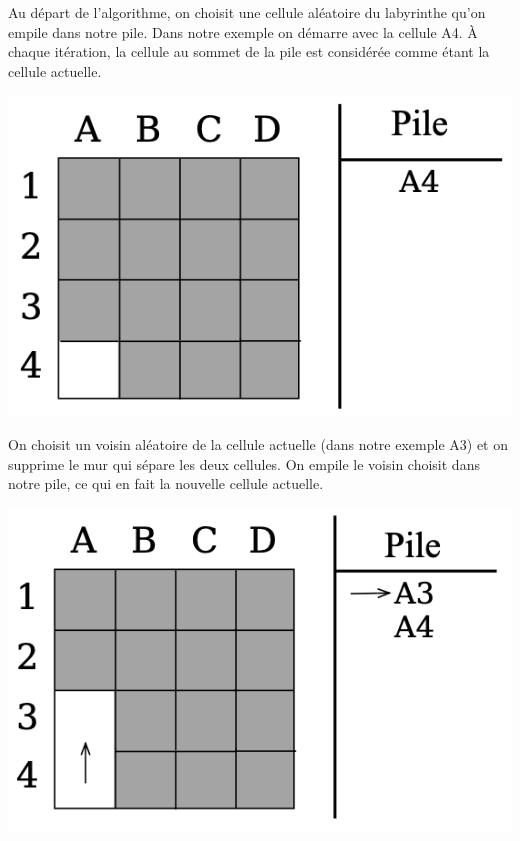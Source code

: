 \begin{minipage}{0.6\textwidth}
Au départ de l'algorithme, on choisit une cellule aléatoire du labyrinthe qu'on empile dans notre pile. Dans notre exemple on démarre avec la cellule A4. À chaque itération, la cellule au sommet de la pile est considérée comme étant la cellule actuelle.
\end{minipage}
\begin{minipage}{0.4\textwidth}
\includegraphics[width=\linewidth]{pics/backtracking1.png}
\end{minipage}

\begin{minipage}{0.6\textwidth}
On choisit un voisin aléatoire de la cellule actuelle (dans notre exemple A3) et on supprime le mur qui sépare les deux cellules. On empile le voisin choisit dans notre pile, ce qui en fait la nouvelle cellule actuelle.
\end{minipage}
\begin{minipage}{0.4\textwidth}
\includegraphics[width=\linewidth]{pics/backtracking2.png}
\end{minipage}

